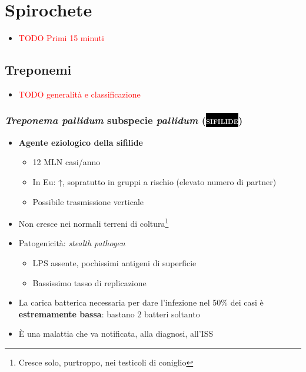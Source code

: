 \documentclass[italian,]{article}
\providecommand{\tightlist}{%
  \setlength{\itemsep}{0pt}\setlength{\parskip}{0pt}}
\newcommand{\pat}[1]{\colorbox{black}{\textcolor{white}{\textsc{#1}}}}
\newcommand{\TODO}[1]{\textcolor{red}{\textsf{\footnotesize{TODO #1}}}} %
\begin{document}
\hypertarget{spirochete}{%
\section{Spirochete}\label{spirochete}}

\begin{itemize}
\item
  \TODO{Primi 15 minuti}
\end{itemize}

\hypertarget{treponemi}{%
\subsection{Treponemi}\label{treponemi}}

\begin{itemize}
\item
  \TODO{generalità e classificazione}
\end{itemize}

\hypertarget{treponema-pallidum-subspecie-pallidum}{%
\subsubsection{\texorpdfstring{\emph{Treponema pallidum} subspecie
\emph{pallidum}
(\pat{sifilide})}{Treponema pallidum subspecie pallidum ()}}\label{treponema-pallidum-subspecie-pallidum}}

\begin{itemize}
\tightlist
\item
  \textbf{Agente eziologico della sifilide}

  \begin{itemize}
  \tightlist
  \item
    12 MLN casi/anno
  \item
    In Eu: ↑, sopratutto in gruppi a rischio (elevato numero di partner)
  \item
    Possibile trasmissione verticale
  \end{itemize}
\item
  Non cresce nei normali terreni di coltura\footnote{Cresce solo,
    purtroppo, nei testicoli di coniglio}
\item
  Patogenicità: \emph{stealth pathogen}

  \begin{itemize}
  \tightlist
  \item
    LPS assente, pochissimi antigeni di superficie
  \item
    Bassissimo tasso di replicazione
  \end{itemize}
\item
  La carica batterica necessaria per dare l'infezione nel 50\% dei casi
  è \textbf{estremamente bassa}: bastano 2 batteri soltanto
\item
  È una malattia che va notificata, alla diagnosi, all'ISS
\end{itemize}
\end{document}
